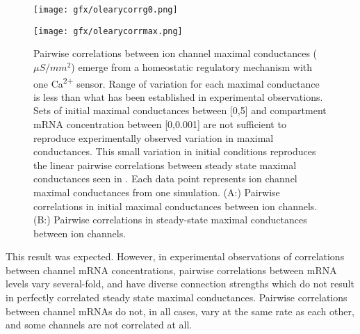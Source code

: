 \begin{figure}[H]
    \centering
    \begin{minipage}{\textwidth}
    \centering
    \texttt{[image: gfx/olearycorrg0.png]}
    \end{minipage}
    \begin{minipage}{\textwidth}
    \centering
    \texttt{[image: gfx/olearycorrmax.png]}
    \end{minipage}
    
\caption[Correlations between ion channels after homeostatic regulation.]{Pairwise correlations between ion channel maximal conductances ($\mu S/mm^2$) emerge from a homeostatic regulatory mechanism with one Ca\textsuperscript{2+} sensor. Range of variation for each maximal conductance is less than what has been established in experimental observations\cite{golowasch_activity-dependent_1999}. Sets of initial maximal conductances between [0,5] and compartment mRNA concentration between [0,0.001] are not sufficient to reproduce experimentally observed variation in maximal conductances. This small variation in initial conditions reproduces the linear pairwise correlations between steady state maximal conductances seen in \cite{oleary_cell_2014}. Each data point represents ion channel maximal conductances from one simulation. (\textsc{A:}) Pairwise correlations in initial maximal conductances between ion channels. (\textsc{B:}) Pairwise correlations in steady-state maximal conductances between ion channels.}
    \label{fig:integralcorrelations}
\end{figure}
 
This result was expected. However, in experimental observations of correlations between channel mRNA concentrations, pairwise correlations between mRNA levels vary several-fold, and have diverse connection strengths which do not result in perfectly correlated steady state maximal conductances. Pairwise correlations between channel mRNAs do not, in all cases, vary at the same rate as each other, and some channels are not correlated at all\cite{santin_membrane_2019}.


